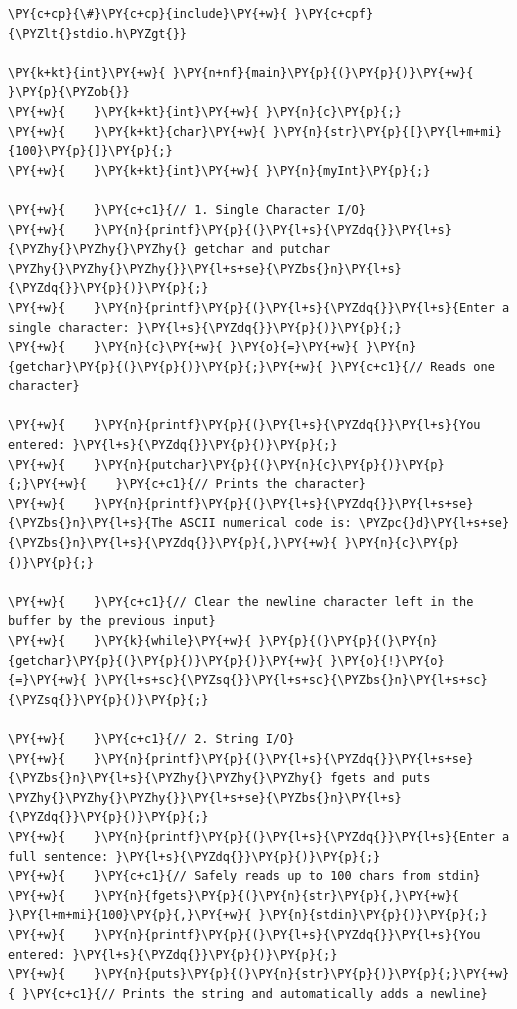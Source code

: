 \begin{Verbatim}[label=\makebox{\url{https://github.com/lucabaldini/cmepda/tree/master/slides/latex/snippets/standard_io.c}},commandchars=\\\{\}]
\PY{c+cp}{\#}\PY{c+cp}{include}\PY{+w}{ }\PY{c+cpf}{\PYZlt{}stdio.h\PYZgt{}}

\PY{k+kt}{int}\PY{+w}{ }\PY{n+nf}{main}\PY{p}{(}\PY{p}{)}\PY{+w}{ }\PY{p}{\PYZob{}}
\PY{+w}{    }\PY{k+kt}{int}\PY{+w}{ }\PY{n}{c}\PY{p}{;}
\PY{+w}{    }\PY{k+kt}{char}\PY{+w}{ }\PY{n}{str}\PY{p}{[}\PY{l+m+mi}{100}\PY{p}{]}\PY{p}{;}
\PY{+w}{    }\PY{k+kt}{int}\PY{+w}{ }\PY{n}{myInt}\PY{p}{;}

\PY{+w}{    }\PY{c+c1}{// 1. Single Character I/O}
\PY{+w}{    }\PY{n}{printf}\PY{p}{(}\PY{l+s}{\PYZdq{}}\PY{l+s}{\PYZhy{}\PYZhy{}\PYZhy{} getchar and putchar \PYZhy{}\PYZhy{}\PYZhy{}}\PY{l+s+se}{\PYZbs{}n}\PY{l+s}{\PYZdq{}}\PY{p}{)}\PY{p}{;}
\PY{+w}{    }\PY{n}{printf}\PY{p}{(}\PY{l+s}{\PYZdq{}}\PY{l+s}{Enter a single character: }\PY{l+s}{\PYZdq{}}\PY{p}{)}\PY{p}{;}
\PY{+w}{    }\PY{n}{c}\PY{+w}{ }\PY{o}{=}\PY{+w}{ }\PY{n}{getchar}\PY{p}{(}\PY{p}{)}\PY{p}{;}\PY{+w}{ }\PY{c+c1}{// Reads one character}

\PY{+w}{    }\PY{n}{printf}\PY{p}{(}\PY{l+s}{\PYZdq{}}\PY{l+s}{You entered: }\PY{l+s}{\PYZdq{}}\PY{p}{)}\PY{p}{;}
\PY{+w}{    }\PY{n}{putchar}\PY{p}{(}\PY{n}{c}\PY{p}{)}\PY{p}{;}\PY{+w}{    }\PY{c+c1}{// Prints the character}
\PY{+w}{    }\PY{n}{printf}\PY{p}{(}\PY{l+s}{\PYZdq{}}\PY{l+s+se}{\PYZbs{}n}\PY{l+s}{The ASCII numerical code is: \PYZpc{}d}\PY{l+s+se}{\PYZbs{}n}\PY{l+s}{\PYZdq{}}\PY{p}{,}\PY{+w}{ }\PY{n}{c}\PY{p}{)}\PY{p}{;}

\PY{+w}{    }\PY{c+c1}{// Clear the newline character left in the buffer by the previous input}
\PY{+w}{    }\PY{k}{while}\PY{+w}{ }\PY{p}{(}\PY{p}{(}\PY{n}{getchar}\PY{p}{(}\PY{p}{)}\PY{p}{)}\PY{+w}{ }\PY{o}{!}\PY{o}{=}\PY{+w}{ }\PY{l+s+sc}{\PYZsq{}}\PY{l+s+sc}{\PYZbs{}n}\PY{l+s+sc}{\PYZsq{}}\PY{p}{)}\PY{p}{;}

\PY{+w}{    }\PY{c+c1}{// 2. String I/O}
\PY{+w}{    }\PY{n}{printf}\PY{p}{(}\PY{l+s}{\PYZdq{}}\PY{l+s+se}{\PYZbs{}n}\PY{l+s}{\PYZhy{}\PYZhy{}\PYZhy{} fgets and puts \PYZhy{}\PYZhy{}\PYZhy{}}\PY{l+s+se}{\PYZbs{}n}\PY{l+s}{\PYZdq{}}\PY{p}{)}\PY{p}{;}
\PY{+w}{    }\PY{n}{printf}\PY{p}{(}\PY{l+s}{\PYZdq{}}\PY{l+s}{Enter a full sentence: }\PY{l+s}{\PYZdq{}}\PY{p}{)}\PY{p}{;}
\PY{+w}{    }\PY{c+c1}{// Safely reads up to 100 chars from stdin}
\PY{+w}{    }\PY{n}{fgets}\PY{p}{(}\PY{n}{str}\PY{p}{,}\PY{+w}{ }\PY{l+m+mi}{100}\PY{p}{,}\PY{+w}{ }\PY{n}{stdin}\PY{p}{)}\PY{p}{;}
\PY{+w}{    }\PY{n}{printf}\PY{p}{(}\PY{l+s}{\PYZdq{}}\PY{l+s}{You entered: }\PY{l+s}{\PYZdq{}}\PY{p}{)}\PY{p}{;}
\PY{+w}{    }\PY{n}{puts}\PY{p}{(}\PY{n}{str}\PY{p}{)}\PY{p}{;}\PY{+w}{ }\PY{c+c1}{// Prints the string and automatically adds a newline}


\end{Verbatim}
